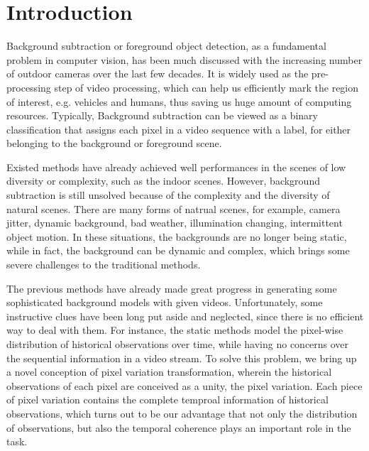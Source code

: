 \documentclass[journal]{IEEEtran}
\begin{document}
\IEEEpeerreviewmaketitle

\section{Introduction}
Background subtraction or foreground object detection, as a fundamental problem in computer vision, has been much discussed with the increasing number of outdoor cameras over the last few decades.
It is widely used as the pre-processing step of video processing, which can help us efficiently mark the region of interest, e.g. vehicles and humans, thus saving us huge amount of computing resources.
Typically, Background subtraction can be viewed as a binary classification that assigns each pixel in a video sequence with a label, for either belonging to the background or foreground scene. 

Existed methods have already achieved well performances in the scenes of low diversity or complexity, such as the indoor scenes. However, background subtraction is still unsolved because of the complexity and the diversity of natural scenes.
There are many forms of natrual scenes, for example, camera jitter, dynamic background, bad weather, illumination changing, intermittent object motion. In these situations, the backgrounds are no longer being static, while in fact, the background can be dynamic and complex, which brings some severe challenges to the traditional methods.

The previous methods have already made great progress in generating some sophisticated background models with given videos. Unfortunately, some instructive clues have been long put aside and neglected, since there is no efficient way to deal with them. For instance, the static methods model the pixel-wise distribution of historical observations over time, while having no concerns over the sequential information in a video stream. To solve this problem, we bring up a novel conception of pixel variation transformation, wherein the historical observations of each pixel are conceived as a unity, the pixel variation. Each piece of pixel variation contains the complete temproal information of historical observations, which turns out to be our advantage that not only the distribution of observations, but also the temporal coherence plays an important role in the task.
\end{document}
